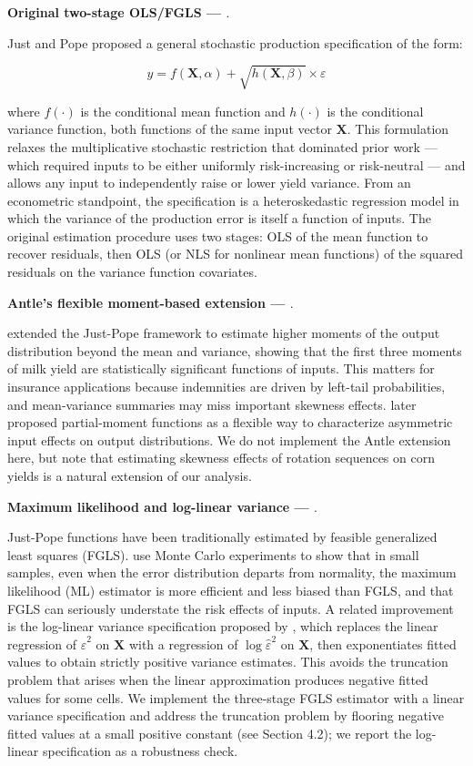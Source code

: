 \documentclass[11pt,letterpaper]{article}
\theoremstyle{remark}
\theoremstyle{plain}
\theoremstyle{definition}
\begin{document}
\textbf{Original two-stage OLS/FGLS — \cite{Just1978, Just1979}}. 

Just and Pope proposed a general stochastic production specification of the form:

\begin{equation}
    y = f(\mathbf{X},\alpha)+\sqrt{h(\mathbf{X},\beta)}\times \varepsilon
\end{equation}

where $f(\cdot)$ is the conditional mean function and $h(\cdot)$ is the conditional variance function, both functions of the same input vector $\mathbf{X}$. This formulation relaxes the multiplicative stochastic restriction that dominated prior work — which
required inputs to be either uniformly risk-increasing or risk-neutral — and allows any input to independently raise or lower yield variance. From an econometric standpoint, the specification is a heteroskedastic regression model in which the variance of the production error is itself a function of inputs. The original estimation procedure uses two stages: OLS of the mean function to recover residuals, then OLS (or NLS for nonlinear mean functions) of the squared residuals on the variance function covariates.

\textbf{Antle's flexible moment-based extension — \cite{antle1983, Antle2010}}. 

\cite{antle1983} extended the Just-Pope framework to estimate higher moments of the output distribution beyond the mean and variance, showing that the first three moments of milk yield are statistically significant functions of inputs. This matters for
insurance applications because indemnities are driven by left-tail probabilities, and mean-variance summaries may miss important skewness effects. \cite{Antle2010} later proposed partial-moment functions as a flexible way to characterize asymmetric input effects on output distributions. We do not implement the Antle extension here, but note that estimating skewness effects of rotation sequences on corn yields is a natural extension of our analysis.

\textbf{Maximum likelihood and log-linear variance — \cite{Harvey1976, Saha1997}}. 

Just-Pope functions have been traditionally estimated by feasible generalized least squares (FGLS). \cite{Saha1997} use Monte Carlo
experiments to show that in small samples, even when the error distribution departs from normality, the maximum likelihood (ML) estimator is more efficient and less biased than FGLS, and that FGLS can seriously understate the risk effects of inputs. A related improvement is the log-linear variance specification proposed by \cite{Harvey1976}, which replaces the linear regression of $\hat{\varepsilon}^2$ on $\mathbf{X}$ with a regression of $\log \hat{\varepsilon}^2$ on $\mathbf{X}$, then exponentiates fitted values to obtain strictly positive variance estimates. This avoids the truncation problem that arises when the linear approximation produces negative fitted values for some cells. We implement the three-stage FGLS estimator with a linear variance specification and
address the truncation problem by flooring negative fitted values at a small positive constant (see Section 4.2); we report the log-linear specification as a robustness check.
\end{document}
